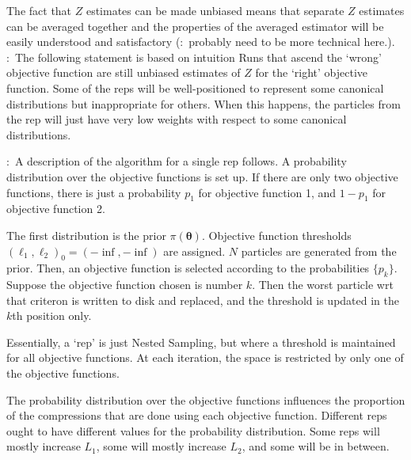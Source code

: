 \documentclass[entropy,article,submit,moreauthors,pdftex,10pt,a4paper]{Definitions/mdpi}
\newcommand{\xx}{\boldsymbol{\theta}}
\newcommand{\todo}{\color{blue}{\bf TODO}:~}
\begin{document}
The fact that $Z$ estimates can be made unbiased means that separate $Z$
estimates can be averaged together and the properties of the averaged estimator
will be easily understood and satisfactory ({\todo probably need to be more
technical here.}). {\todo The following statement is based on intuition}
Runs that ascend the `wrong' objective function are still unbiased
estimates of $Z$ for the `right' objective function. Some of the reps will
be well-positioned to represent some canonical distributions but inappropriate
for others. When this happens, the particles from the rep will just have very
low weights with respect to some canonical distributions.

{\todo A description of the algorithm for a single rep follows}.
A probability distribution over the objective functions is set up. If there
are only two objective functions, there is just a probability $p_1$ for
objective function 1, and $1-p_1$ for objective function 2.

The first distribution is the prior $\pi(\xx)$. Objective function thresholds
$(\ell_1, \ell_2)_0 = (-\inf, -\inf)$ are assigned.
$N$ particles are generated
from the prior. Then, an objective function is selected according to the
probabilities $\{p_k\}$. Suppose the objective function chosen is number $k$.
Then the worst particle wrt that criteron is written to disk and replaced,
and the threshold is updated in the $k$th position only.

Essentially, a `rep' is just Nested Sampling, but where a threshold is
maintained for all objective functions. At each iteration, the space is
restricted by only one of the objective functions.

The probability distribution over the objective functions influences the
proportion of the compressions that are done using each objective function.
Different reps ought to have different values for the probability distribution.
Some reps will mostly increase $L_1$, some will mostly increase $L_2$, and
some will be in between.
\end{document}
